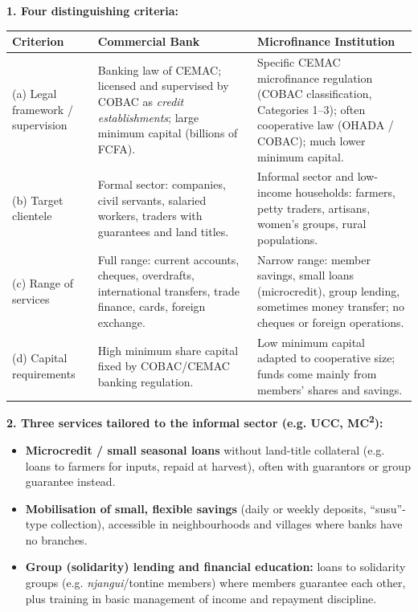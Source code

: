 \documentclass[11pt]{article}
\begin{document}
\begin{corrige}

\textbf{1. Four distinguishing criteria:}

\begin{center}
\begin{tabularx}{\linewidth}{|l|X|X|}
\hline
\rowcolor{popblueL} \textbf{Criterion} & \textbf{Commercial Bank} & \textbf{Microfinance Institution} \\
\hline
(a) Legal framework / supervision & Banking law of CEMAC; licensed and supervised by COBAC as \emph{credit establishments}; large minimum capital (billions of FCFA). & Specific CEMAC microfinance regulation (COBAC classification, Categories 1--3); often cooperative law (OHADA / COBAC); much lower minimum capital. \\
\hline
(b) Target clientele & Formal sector: companies, civil servants, salaried workers, traders with guarantees and land titles. & Informal sector and low-income households: farmers, petty traders, artisans, women's groups, rural populations. \\
\hline
(c) Range of services & Full range: current accounts, cheques, overdrafts, international transfers, trade finance, cards, foreign exchange. & Narrow range: member savings, small loans (microcredit), group lending, sometimes money transfer; no cheques or foreign operations. \\
\hline
(d) Capital requirements & High minimum share capital fixed by COBAC/CEMAC banking regulation. & Low minimum capital adapted to cooperative size; funds come mainly from members' shares and savings. \\
\hline
\end{tabularx}
\end{center}

\textbf{2. Three services tailored to the informal sector (e.g. UCC, MC\textsuperscript{2}):}
\begin{itemize}
\item \textbf{Microcredit / small seasonal loans} without land-title collateral (e.g. loans to farmers for inputs, repaid at harvest), often with guarantors or group guarantee instead.
\item \textbf{Mobilisation of small, flexible savings} (daily or weekly deposits, ``susu''-type collection), accessible in neighbourhoods and villages where banks have no branches.
\item \textbf{Group (solidarity) lending and financial education:} loans to solidarity groups (e.g. \emph{njangui}/tontine members) where members guarantee each other, plus training in basic management of income and repayment discipline.
\end{itemize}


\end{corrige}
\end{document}
